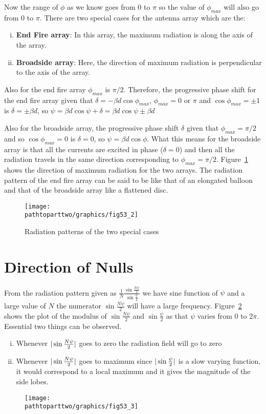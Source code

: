 Now the range of $\phi$ as we know goes from $0$ to $\pi$ so the value of $\phi_{max}$ will also go from $0$ to $\pi$.
There are two special cases for the antenna array which are the:
\begin{enumerate}[(i)]
\item \textbf{End Fire array}: In this array, the maximum radiation is along the axis of the array. 
\item \textbf{Broadside array}: Here, the direction of maximum radiation is perpendicular to the axis of the array.
\end{enumerate}

Also for the end fire array $\phi_{max}$ is $\pi/2$. Therefore, the progressive phase shift for the end fire array given that $\delta = -\beta d\cos{\phi_{max}}$, $\phi_{max}=0$ or $\pi$ and $\cos{\phi_{max}} = \pm 1$ is $\delta = \pm \beta d$, so $\psi = \beta d \cos{\psi} + \delta = \beta d \cos{\psi} \pm \beta d $

Also for the broadside array, the progressive phase shift $\delta$ given that $\phi_{max} = \pi/2$ and so $\cos\phi_{max} = 0$ is $\delta = 0$, so $\psi = \beta d \cos{\phi}$. What this means for the broadside array is that all the currents are excited in phase ($\delta = 0$) and then all the radiation travels in the same direction corresponding to $\phi_{max} = \pi /2$. Figure~\ref{53.2} shows the direction of maximum radiation for the two arrays. The radiation pattern of the end fire array can be said to be like that of an elongated balloon and that of the broadside array like a flattened disc.
\begin{figure}[h]
\centering
\texttt{[image: \\pathtoparttwo/graphics/fig53\_2]}
\caption{Radiation patterns of the two special cases}
\label{53.2}
\end{figure}

\section{Direction of Nulls}
From the radiation pattern given as $\frac{1}{N} \frac{\sin{\frac{N\psi}{2}}}{\sin{\frac{\psi}{2}}} $ we have sine function of $\psi$ and a large value of $N$ the numerator $\sin{\frac{N\psi}{2}} $ will have a large frequency. Figure~\ref{53.3} shows the plot of the modulus of $\sin{\frac{N\psi}{2}}$ and $\sin{\frac{\psi}{2}}$ as that $\psi$ varies from $0$ to $2\pi$. Essential two things can be observed. 
\begin{enumerate}[(i)]
\item Whenever $\arrowvert \sin{\frac{N\psi}{2}} \arrowvert$ goes to zero the radiation field will go to zero 
\item Whenever $\arrowvert \sin{\frac{N\psi}{2}} \arrowvert$ goes to maximum since $\arrowvert \sin{\frac{\psi}{2}} \arrowvert$ is a slow varying function, it would correspond to a local maximum and it gives the magnitude of the side lobes.
\end{enumerate}
\begin{figure}[h]
\centering
\texttt{[image: \\pathtoparttwo/graphics/fig53\_3]}
\caption{}
\label{53.3}
\end{figure}

